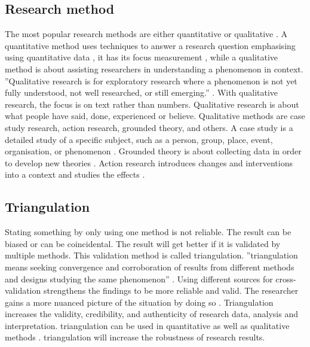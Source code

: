 \subsection{Research method}
\label{sub:researchmethods}
The most popular research methods are either quantitative or qualitative \parencite[p.~65]{Recker2012}. A quantitative method uses techniques to answer a research question emphasising using quantitative data \parencite[p.~66]{Recker2012}, it has its focus measurement \parencite[p.~88]{Recker2012}, while a qualitative method is about assisting researchers in understanding a phenomenon in context. ''Qualitative research is for exploratory research where a phenomenon is not yet fully understood, not well researched, or still emerging.'' \parencite[p.~84]{Recker2012}. With qualitative research, the focus is on text rather than numbers. Qualitative research is about what people have said, done, experienced or believe. Qualitative methods are case study research, action research, grounded theory, and others. A case study is a detailed study of a specific subject, such as a person, group, place, event, organisation, or phenomenon \parencite[p.~95]{Recker2012}. Grounded theory is about collecting data in order to develop new theories \parencite[p.~102]{Recker2012}. Action research introduces changes and interventions into a context and studies the effects \parencite[p.~99]{Recker2012}.

\subsection{Triangulation}
\label{sub:triangulation}
Stating something by only using one method is not reliable. The result can be biased or can be coincidental. The result will get better if it is validated by multiple methods. This validation method is called \gls{triangulation}. ''\Gls{triangulation} means seeking convergence and corroboration of results from different methods and designs studying the same phenomenon'' \parencite[p.~104]{Recker2012}. Using different sources for cross-validation strengthens the findings to be more reliable and valid. The researcher gains a more nuanced picture of the situation by doing so \parencite[p.~91]{Recker2012}. Triangulation increases the validity, credibility, and authenticity of research data, analysis and interpretation. \Gls{triangulation} can be used in quantitative as well as qualitative methods \parencite[p.~91]{Recker2012}. \Gls{triangulation} will increase the robustness of research results.

